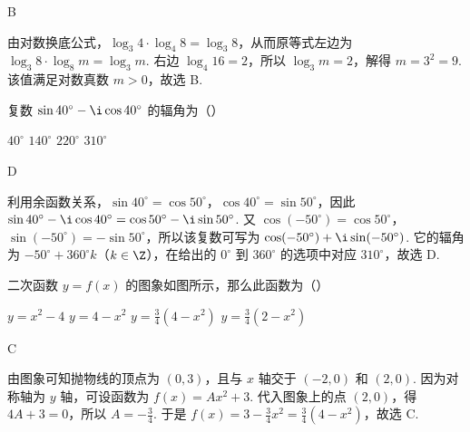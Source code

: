\documentclass[UTF8,a4paper,oneside,11pt]{ctexbook}
\begin{document}
\begin{answer}
B
\end{answer}

\begin{solution}
由对数换底公式，\(\log_3 4\cdot\log_4 8=\log_3 8\)，从而原等式左边为 \(\log_3 8\cdot\log_8m=\log_3m\). 右边 \(\log_4 16=2\)，所以 \(\log_3m=2\)，解得 \(m=3^2=9\). 该值满足对数真数 \(m>0\)，故选 B.
\end{solution}

\begin{problem}
复数 \(\sin 40^\circ - \i\cos 40^\circ\) 的辐角为（\quad）

\choices
    {\(40^\circ\)}
    {\(140^\circ\)}
    {\(220^\circ\)}
    {\(310^\circ\)}
\end{problem}

\begin{answer}
D
\end{answer}

\begin{solution}
利用余函数关系，\(\sin40^\circ=\cos50^\circ\)，\(\cos40^\circ=\sin50^\circ\)，因此 \(\sin40^\circ-\i\cos40^\circ=\cos50^\circ-\i\sin50^\circ\). 又 \(\cos(-50^\circ)=\cos50^\circ\)，\(\sin(-50^\circ)=-\sin50^\circ\)，所以该复数可写为 \(\cos(-50^\circ)+\i\sin(-50^\circ)\). 它的辐角为 \(-50^\circ+360^\circ k\)（\(k\in\Z\)），在给出的 \(0^\circ\) 到 \(360^\circ\) 的选项中对应 \(310^\circ\)，故选 D.
\end{solution}

\begin{problem}
二次函数 \(y = f(x)\) 的图象如图所示，那么此函数为（\quad）


\choices
    {\(y = x^2 - 4\)}
    {\(y = 4 - x^2\)}
    {\(y = \frac{3}{4}\left(4 - x^2\right)\)}
    {\(y = \frac{3}{4}\left(2 - x^2\right)\)}
\end{problem}

\begin{answer}
C
\end{answer}

\begin{solution}
由图象可知抛物线的顶点为 \((0,3)\)，且与 \(x\) 轴交于 \((-2,0)\) 和 \((2,0)\). 因为对称轴为 \(y\) 轴，可设函数为 \(f(x)=Ax^2+3\). 代入图象上的点 \((2,0)\)，得 \(4A+3=0\)，所以 \(A=-\frac34\). 于是 \(f(x)=3-\frac34x^2=\frac34\left(4-x^2\right)\)，故选 C.
\end{solution}
\end{document}
